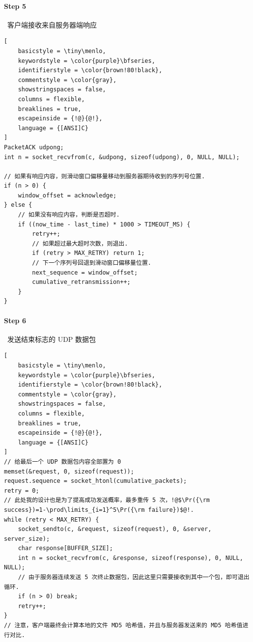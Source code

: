 \documentclass{article}
\begin{document}
\paragraph*{Step 5}~{客户端接收来自服务器端响应}
\begin{lstlisting}[
    basicstyle = \tiny\menlo,
    keywordstyle = \color{purple}\bfseries,
    identifierstyle = \color{brown!80!black},
    commentstyle = \color{gray},
    showstringspaces = false,
    columns = flexible,
    breaklines = true,
    escapeinside = {!@}{@!},
    language = {[ANSI]C}
]
PacketACK udpong;
int n = socket_recvfrom(c, &udpong, sizeof(udpong), 0, NULL, NULL);

// 如果有响应内容，则滑动窗口偏移量移动到服务器期待收到的序列号位置.
if (n > 0) {
    window_offset = acknowledge;
} else {
    // 如果没有响应内容，判断是否超时.
    if ((now_time - last_time) * 1000 > TIMEOUT_MS) {
        retry++;
        // 如果超过最大超时次数，则退出.
        if (retry > MAX_RETRY) return 1;
        // 下一个序列号回退到滑动窗口偏移量位置.
        next_sequence = window_offset;
        cumulative_retransmission++;
    }
}
\end{lstlisting}

\paragraph*{Step 6}~{发送结束标志的 UDP 数据包}
\begin{lstlisting}[
    basicstyle = \tiny\menlo,
    keywordstyle = \color{purple}\bfseries,
    identifierstyle = \color{brown!80!black},
    commentstyle = \color{gray},
    showstringspaces = false,
    columns = flexible,
    breaklines = true,
    escapeinside = {!@}{@!},
    language = {[ANSI]C}
]
// 给最后一个 UDP 数据包内容全部置为 0
memset(&request, 0, sizeof(request));
request.sequence = socket_htonl(cumulative_packets);
retry = 0;
// 此处我的设计也是为了提高成功发送概率，最多重传 5 次，!@$\Pr({\rm success})=1-\prod\limits_{i=1}^5\Pr({\rm failure})$@!.
while (retry < MAX_RETRY) {
    socket_sendto(c, &request, sizeof(request), 0, &server, server_size);
    char response[BUFFER_SIZE];
    int n = socket_recvfrom(c, &response, sizeof(response), 0, NULL, NULL);
    // 由于服务器连续发送 5 次终止数据包，因此这里只需要接收到其中一个包，即可退出循环.
    if (n > 0) break;
    retry++;
}
// 注意，客户端最终会计算本地的文件 MD5 哈希值，并且与服务器发送来的 MD5 哈希值进行对比.
\end{lstlisting}
\end{document}
